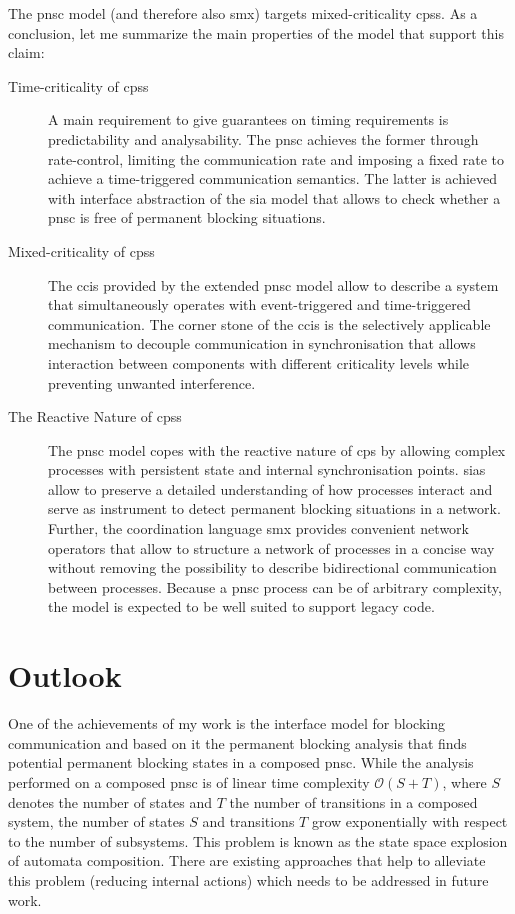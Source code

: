 The \gls{pnsc} model (and therefore also \gls*{smx}) targets mixed-criticality \glspl{cps}.
As a conclusion, let me summarize the main properties of the model that support this claim:
\begin{description}
    \item[Time-criticality of \glspl{cps}] A main requirement to give guarantees on timing requirements is predictability and analysability.
        The \gls{pnsc} achieves the former through rate-control, \ie limiting the communication rate and imposing a fixed rate to achieve a time-triggered communication semantics.
        The latter is achieved with interface abstraction of the \gls{sia} model that allows to check whether a \gls{pnsc} is free of permanent blocking situations.
    \item[Mixed-criticality of \glspl{cps}] The \glspl{cci} provided by the extended \gls{pnsc} model allow to describe a system that simultaneously operates with event-triggered and time-triggered communication.
        The corner stone of the \glspl{cci} is the selectively applicable mechanism to decouple communication in synchronisation that allows interaction between components with different criticality levels while preventing unwanted interference.
    \item[The Reactive Nature of \glspl{cps}] The \gls{pnsc} model copes with the reactive nature of \gls{cps} by allowing complex processes with persistent state and internal synchronisation points.
        \Glspl{sia} allow to preserve a detailed understanding of how processes interact and serve as instrument to detect permanent blocking situations in a network.
        Further, the coordination language \gls*{smx} provides convenient network operators that allow to structure a network of processes in a concise way without removing the possibility to describe bidirectional communication between processes.
        Because a \gls{pnsc} process can be of arbitrary complexity, the model is expected to be well suited to support legacy code.
\end{description}

\section{Outlook}
\label{sect_conclusion_outlook}
One of the achievements of my work is the interface model for blocking communication and based on it the permanent blocking analysis that finds potential permanent blocking states in a composed \gls{pnsc}.
While the analysis performed on a composed \gls{pnsc} is of linear time complexity $\mathcal{O}(S+T)$, where $S$ denotes the number of states and $T$ the number of transitions in a composed system, the number of states $S$ and transitions $T$ grow exponentially with respect to the number of subsystems.
This problem is known as the state space explosion of automata composition.
There are existing approaches that help to alleviate this problem (\eg reducing internal actions) which needs to be addressed in future work.

